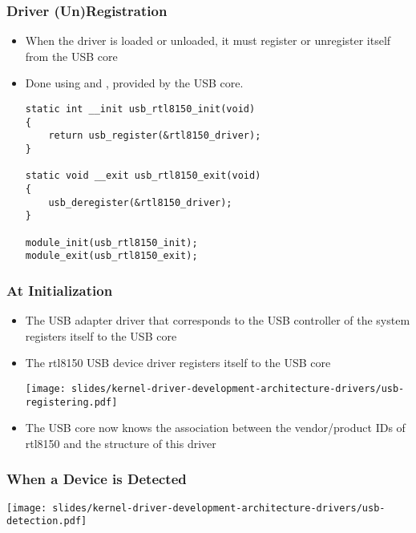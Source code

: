 \begin{frame}[fragile]
  \frametitle{Driver (Un)Registration}
  \begin{itemize}
  \item When the driver is loaded or unloaded, it must register or
    unregister itself from the USB core
  \item Done using  and ,
    provided by the USB core.
\begin{verbatim}
static int __init usb_rtl8150_init(void)
{
    return usb_register(&rtl8150_driver);
}

static void __exit usb_rtl8150_exit(void)
{
    usb_deregister(&rtl8150_driver);
}

module_init(usb_rtl8150_init);
module_exit(usb_rtl8150_exit);
\end{verbatim}
  \end{itemize}
\end{frame}

\begin{frame}
  \frametitle{At Initialization}
  \begin{itemize}
  \item The USB adapter driver that corresponds to the USB controller
    of the system registers itself to the USB core
  \item The rtl8150 USB device driver registers itself to the USB core
    \begin{center}
      \texttt{[image: slides/kernel-driver-development-architecture-drivers/usb-registering.pdf]}
    \end{center}
  \item The USB core now knows the association between the
    vendor/product IDs of rtl8150 and the  structure
    of this driver
  \end{itemize}
\end{frame}

\begin{frame}
  \frametitle{When a Device is Detected}
  \begin{center}
    \texttt{[image: slides/kernel-driver-development-architecture-drivers/usb-detection.pdf]}
  \end{center}
\end{frame}

